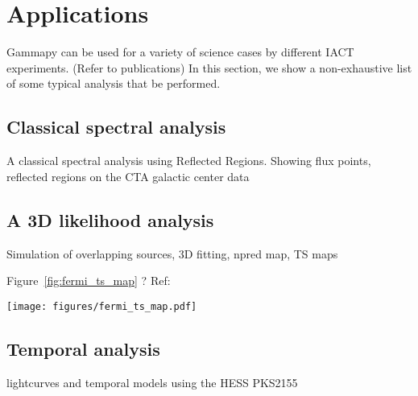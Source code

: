 \section{Applications}
\label{sec:applications}

Gammapy can be used for a variety of science cases by different IACT experiments. (Refer to publications)
In this section, we show a non-exhaustive list of some typical analysis that be performed.

\subsection{Classical spectral analysis}
\label{ssec:1D-analysis}

A classical spectral analysis using Reflected Regions. Showing flux points, reflected regions on the CTA galactic center data

\subsection{A 3D likelihood analysis}
\label{ssec:3D-analysis}


Simulation of overlapping sources, 3D fitting, npred map, TS maps


 Figure~\ref{fig:fermi_ts_map} ?
Ref:~\citep{Stewart2009}
\begin{figure*}[t]
        \centering
        \texttt{[image: figures/fermi\_ts\_map.pdf]}
        \caption{Fermi-LAT TS map in two energy bands} \label{fig:fermi_ts_map}
\end{figure*}

\subsection{Temporal analysis}
\label{ssec:temporal-analysis}

lightcurves and temporal models using the HESS PKS2155

